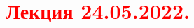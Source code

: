 \documentclass[main.tex]{subfiles}
\begin{document}
\section{\textcolor{red}{Лекция 24.05.2022.}}
\end{document}
